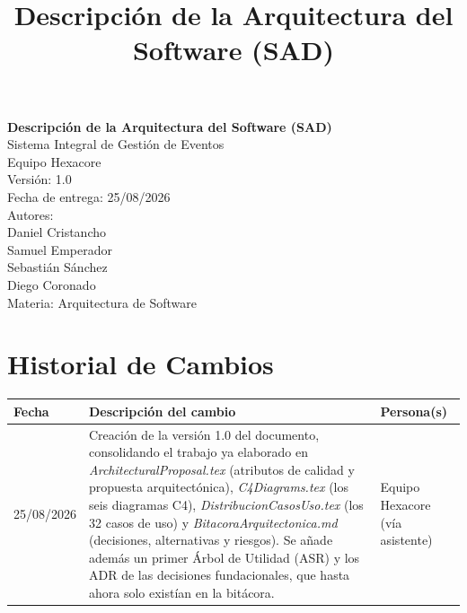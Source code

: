 \documentclass[11pt,a4paper]{article}
\title{\textbf{Descripción de la Arquitectura del Software (SAD)}}
\author{}
\date{}
\begin{document}
\begin{titlepage}
\centering
\vspace*{2cm}
{\LARGE \textbf{Descripción de la Arquitectura del Software (SAD)}}\\[0.4cm]
{\Large Sistema Integral de Gestión de Eventos}\\[1.5cm]
{\Large Equipo Hexacore}\\[2cm]
{\large Versión: 1.0}\\[0.5cm]
{\large Fecha de entrega: 25/08/2026}\\[2cm]
{\large Autores:}\\
{\large Daniel Cristancho}\\
{\large Samuel Emperador}\\
{\large Sebastián Sánchez}\\
{\large Diego Coronado}\\
\vfill
{\small Materia: Arquitectura de Software}
\end{titlepage}

\section*{Historial de Cambios}

\begin{center}
\begin{longtable}{|p{2.5cm}|p{7cm}|p{4cm}|}
\hline
\textbf{Fecha} & \textbf{Descripción del cambio} & \textbf{Persona(s)} \\
\hline
\endhead
25/08/2026 & Creación de la versión 1.0 del documento, consolidando el trabajo ya elaborado en
\textit{ArchitecturalProposal.tex} (atributos de calidad y propuesta arquitectónica),
\textit{C4Diagrams.tex} (los seis diagramas C4), \textit{DistribucionCasosUso.tex} (los 32 casos
de uso) y \textit{BitacoraArquitectonica.md} (decisiones, alternativas y riesgos). Se añade
además un primer Árbol de Utilidad (ASR) y los ADR de las decisiones fundacionales, que hasta
ahora solo existían en la bitácora. & Equipo Hexacore (vía asistente) \\
\hline
\end{longtable}
\end{center}

\newpage
\renewcommand{\contentsname}{Tabla de Contenidos}
\tableofcontents
\thispagestyle{empty}
\newpage
\end{document}
